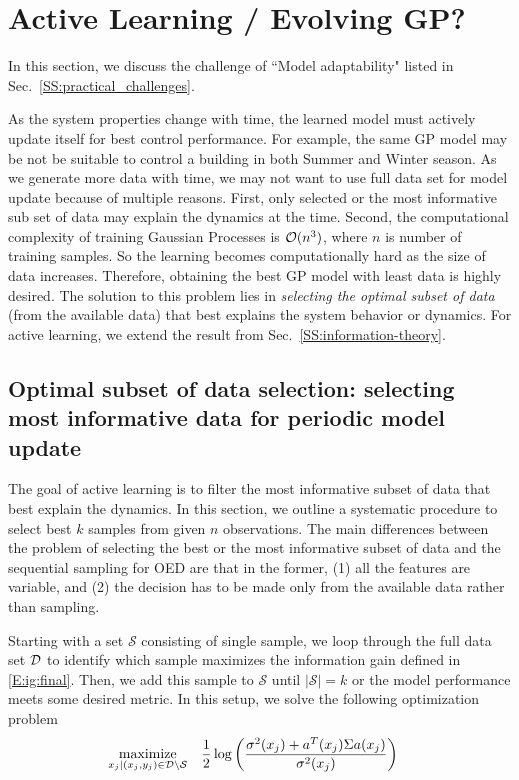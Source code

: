 \section{Active Learning / Evolving GP?}
\label{S:active}

In this section, we discuss the challenge of ``Model adaptability" listed in Sec.~\ref{SS:practical_challenges}.

As the system properties change with time, the learned model must actively update itself for best control performance.
For example, the same GP model may be not be suitable to control a building in both Summer and Winter season.
As we generate more data with time, we may not want to use full data set for model update because of multiple reasons.
First, only selected or the most informative sub set of data may explain the dynamics at the time. Second, the computational complexity of training Gaussian Processes is $\mathcal{O}(n^3)$, where $n$ is number of training samples. So the learning becomes computationally hard as the size of data increases.
Therefore, obtaining the best GP model with least data is highly desired. The solution to this problem lies in \textit{selecting the optimal subset of data} (from the available data) that best explains the system behavior or dynamics.
For active learning, we extend the result from Sec.~\ref{SS:information-theory}.

\subsection{Optimal subset of data selection: selecting most informative data for periodic model update}

The goal of active learning is to filter the most informative subset of data that best explain the dynamics.
In this section, we outline a systematic procedure to select best $k$ samples from given $n$ observations.
The main differences between the problem of selecting the best or the most informative subset of data and the sequential sampling for OED are that in the former, (1) all the features are variable, and (2) the decision has to be made only from the available data rather than sampling. 

Starting with a set \(\mathcal{S}\) consisting of single sample, we loop through the full data set \(\mathcal{D}\) to identify which sample maximizes the information gain defined in \eqref{E:ig:final}. Then, we add this sample to \(\mathcal{S}\) until \(|\mathcal{S}|=k\) or the model performance meets some desired metric. In this setup, we solve the following optimization problem
\begin{align}
\label{E:oed:batch}
\maximize_{x_{j}|(x_j,y_j) \in \mathcal{D} \setminus \mathcal{S}} & \ \ \ \frac{1}{2}\log\left(\frac{\sigma^2(x_j)+a^T(x_j)\Sigma a(x_j)}{\sigma^2(x_j)}\right)
\end{align}

